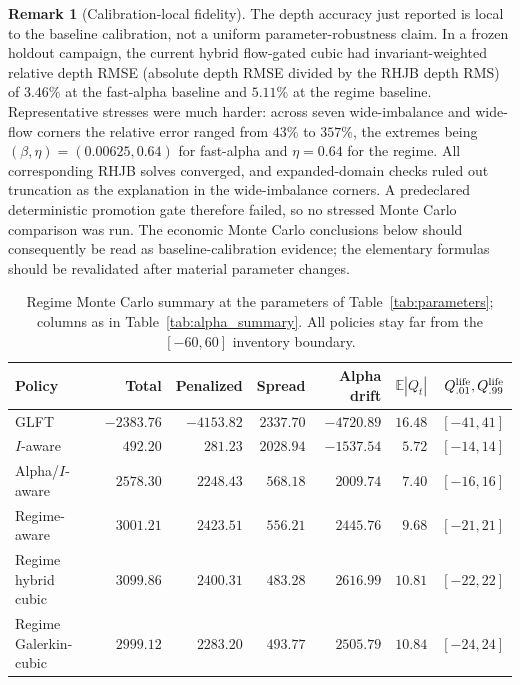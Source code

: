 \documentclass[11pt,a4paper]{article}
\newcommand{\E}{\mathbb{E}}
\theoremstyle{plain}
\theoremstyle{definition}
\newtheorem{remark}{Remark}[section]
\begin{document}
\begin{remark}[Calibration-local fidelity]
\label{rem:calibration_local}
The depth accuracy just reported is local to the baseline calibration, not a
uniform parameter-robustness claim.  In a frozen holdout campaign, the current
hybrid flow-gated cubic had invariant-weighted relative depth RMSE (absolute
depth RMSE divided by the RHJB depth RMS) of \(3.46\%\) at the fast-alpha
baseline and \(5.11\%\) at the regime baseline.  Representative stresses were
much harder: across seven wide-imbalance and wide-flow corners the relative
error ranged from \(43\%\) to \(357\%\), the extremes being
\((\beta,\eta)=(0.00625,0.64)\) for fast-alpha and \(\eta=0.64\) for the
regime.  All corresponding RHJB solves converged,
and expanded-domain checks ruled out truncation as the explanation in the
wide-imbalance corners.  A predeclared deterministic promotion gate therefore
failed, so no stressed Monte Carlo comparison was run.  The economic Monte
Carlo conclusions below should consequently be read as baseline-calibration
evidence; the elementary formulas should be revalidated after material
parameter changes.
\end{remark}

\begin{table}[htbp]
\centering
\setlength{\tabcolsep}{4pt}
\begin{tabular}{lrrrrrr}
\toprule
Policy & Total & Penalized & Spread & Alpha drift & \(\E|Q_t|\) & \(Q^{\rm life}_{.01},Q^{\rm life}_{.99}\)\\
\midrule
GLFT & \(-2383.76\) & \(-4153.82\) & \(2337.70\) & \(-4720.89\) & \(16.48\) & \([-41,41]\)\\
\(I\)-aware & \(492.20\) & \(281.23\) & \(2028.94\) & \(-1537.54\) & \(5.72\) & \([-14,14]\)\\
Alpha/\(I\)-aware & \(2578.30\) & \(2248.43\) & \(568.18\) & \(2009.74\) & \(7.40\) & \([-16,16]\)\\
Regime-aware & \(3001.21\) & \(2423.51\) & \(556.21\) & \(2445.76\) & \(9.68\) & \([-21,21]\)\\
Regime hybrid cubic & \(3099.86\) & \(2400.31\) & \(483.28\) & \(2616.99\) & \(10.81\) & \([-22,22]\)\\
Regime Galerkin-cubic & \(2999.12\) & \(2283.20\) & \(493.77\) & \(2505.79\) & \(10.84\) & \([-24,24]\)\\
\bottomrule
\end{tabular}
\caption{Regime Monte Carlo summary at the parameters of
Table~\ref{tab:parameters}; columns as in Table~\ref{tab:alpha_summary}.  All
policies stay far from the \([-60,60]\) inventory boundary.}
\label{tab:regime_summary}
\end{table}
\end{document}
